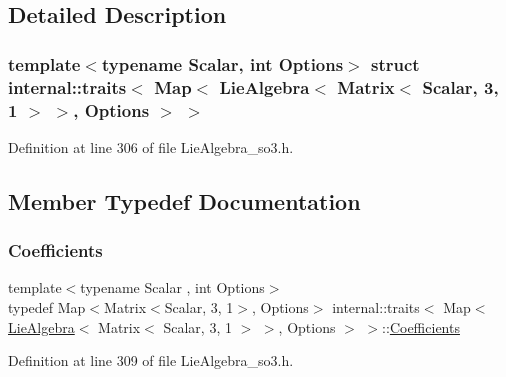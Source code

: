 \subsection{Detailed Description}
\subsubsection*{template$<$typename Scalar, int Options$>$\newline
struct internal\+::traits$<$ Map$<$ Lie\+Algebra$<$ Matrix$<$ Scalar, 3, 1 $>$ $>$, Options $>$ $>$}



Definition at line 306 of file Lie\+Algebra\+\_\+so3.\+h.



\subsection{Member Typedef Documentation}
\hypertarget{structinternal_1_1traits_3_01_map_3_01_lie_algebra_3_01_matrix_3_01_scalar_00_013_00_011_01_4_01_4_00_01_options_01_4_01_4_a24755baa54832046371ad39bee3aa3f5}{}\label{structinternal_1_1traits_3_01_map_3_01_lie_algebra_3_01_matrix_3_01_scalar_00_013_00_011_01_4_01_4_00_01_options_01_4_01_4_a24755baa54832046371ad39bee3aa3f5} 
\subsubsection{\texorpdfstring{Coefficients}{Coefficients}}
{\footnotesize\ttfamily template$<$typename Scalar , int Options$>$ \\
typedef Map$<$Matrix$<$Scalar, 3, 1$>$, Options$>$ internal\+::traits$<$ Map$<$ \hyperlink{class_lie_algebra}{Lie\+Algebra}$<$ Matrix$<$ Scalar, 3, 1 $>$ $>$, Options $>$ $>$\+::\hyperlink{structinternal_1_1traits_3_01_map_3_01_lie_algebra_3_01_matrix_3_01_scalar_00_013_00_011_01_4_01_4_00_01_options_01_4_01_4_a24755baa54832046371ad39bee3aa3f5}{Coefficients}}



Definition at line 309 of file Lie\+Algebra\+\_\+so3.\+h.


